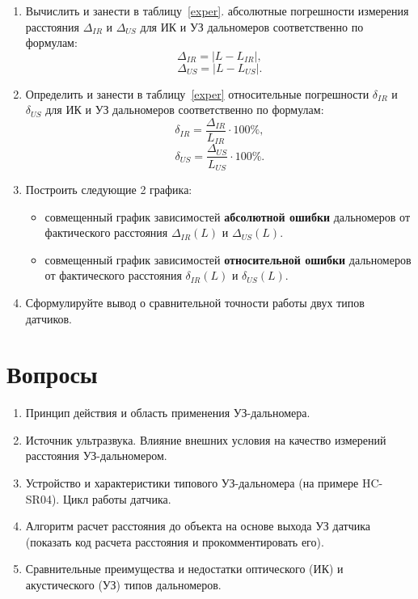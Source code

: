 \documentclass[12pt]{article}
\begin{document}
\begin{enumerate}
	
	\item Вычислить и занести в таблицу~\ref{exper}. абсолютные погрешности измерения расстояния \(\Delta_{IR}\) и \(\Delta_{US}\) для ИК и УЗ дальномеров соответственно по формулам:
	\[\Delta_{IR} = |L - L_{IR}|,\]
	\[\Delta_{US} = |L - L_{US}|.\]
	
	\item Определить и занести в таблицу~\ref{exper} относительные погрешности \(\delta_{IR}\) и \(\delta_{US}\) для ИК и УЗ дальномеров соответственно по формулам:
	\[\delta_{IR} = \frac{\Delta_{IR}}{L_{IR}} \cdot 100\%,\]
	\[\delta_{US} = \frac{\Delta_{US}}{L_{US}} \cdot 100\%.\]
	
	\item Построить следующие 2 графика:
	\begin{itemize}
		\item совмещенный график зависимостей \textbf{абсолютной ошибки} дальномеров от фактического расстояния \(\Delta_{IR}(L)\) и \(\Delta_{US}(L)\).
		
		\item совмещенный график зависимостей \textbf{относительной ошибки} дальномеров от фактического расстояния \(\delta_{IR}(L)\) и \(\delta_{US}(L)\).
	\end{itemize}
	
	\item Сформулируйте вывод о сравнительной точности работы двух типов датчиков.
\end{enumerate}

\section{Вопросы}

\begin{enumerate}
	\item Принцип действия и область применения УЗ-дальномера.
	\item Источник ультразвука. Влияние внешних условия на качество измерений расстояния УЗ-дальномером.
	\item Устройство и характеристики типового УЗ-дальномера (на примере HC-SR04). Цикл работы датчика.
	\item Алгоритм расчет расстояния до объекта на основе выхода УЗ датчика (показать код расчета расстояния и прокомментировать его).
	\item Сравнительные преимущества и недостатки оптического (ИК) и акустического (УЗ) типов дальномеров.
\end{enumerate}
\end{document}

